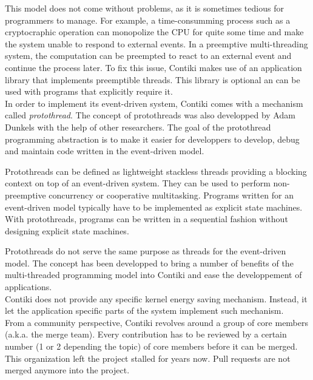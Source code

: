This model does not come without problems, as it is sometimes tedious for programmers to manage.
For example, a time-consumming process such as a cryptocraphic operation can monopolize the CPU for quite some time 
    and make the system unable to respond to external events. 
In a preemptive multi-threading system, the computation can be preempted to react to an external event 
    and continue the process later.
To fix this issue, Contiki makes use of an application library that implements preemptible threads.
This library is optional an can be used with programs that explicitly require it.\\

In order to implement its event-driven system, Contiki comes with a mechanism called \textit{protothread}.
The concept of protothreads was also developped by Adam Dunkels with the help of other researchers.
The goal of the protothread programming abstraction is to make it easier for developpers to develop, debug and maintain code written in the event-driven model.

Protothreads can be defined as lightweight stackless threads providing a blocking context on top of an event-driven system.
They can be used to perform non-preemptive concurrency or cooperative multitasking.
Programs written for an event-driven model typically have to be implemented as explicit state machines.
With protothreads, programs can be written in a sequential fashion without designing explicit state machines.

Protothreads do not serve the same purpose as threads for the event-driven model.
The concept has been developped to bring a number of benefits of the multi-threaded programming model into Contiki
    and ease the developpement of applications.\\

Contiki does not provide any specific kernel energy saving mechanism.
Instead, it let the application specific parts of the system implement such mechanism.\\

From a community perspective, Contiki revolves around a group of core members (a.k.a. the merge team).
Every contribution has to be reviewed by a certain number (1 or 2 depending the topic) of core members before it can be merged.
This organization left the project stalled for years now.
Pull requests are not merged anymore into the project.

